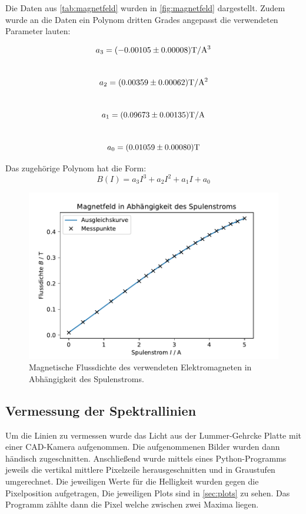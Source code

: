\FloatBarrier
    Die Daten aus \autoref{tab:magnetfeld} wurden in \autoref{fig:magnetfeld} dargestellt. Zudem wurde 
    an die Daten ein Polynom dritten Grades angepasst die verwendeten Parameter lauten:
    \begin{center}
        $$a_3 = (-0.00105 \pm 0.00008)  \si[]{\tesla\per\ampere^3}$$\\
        $$a_2 = (0.00359 \pm 0.00062)  \si[]{\tesla\per\ampere^2}$$\\
        $$a_1 = (0.09673 \pm 0.00135)  \si[]{\tesla/\ampere}$$\\
        $$a_0 = (0.01059 \pm 0.00080)  \si[]{\tesla}$$
    \end{center}
    Das zugehörige Polynom hat die Form:
    \begin{equation*}
      B(I)=a_3I^3+a_2I^2+a_1I+a_0
    \end{equation*}

    \begin{figure}
        \centering
        \includegraphics[width=1\textwidth]{content/grafiken/magnetfeld.pdf}
        \caption{Magnetische Flussdichte des verwendeten Elektromagneten in Abhängigkeit des Spulenstroms.}
        \label{fig:magnetfeld}
      \end{figure}
\subsection{Vermessung der Spektrallinien}
\label{sec:linien}
Um die Linien zu vermessen wurde das Licht aus der Lummer-Gehrcke Platte mit einer CAD-Kamera
aufgenommen. Die aufgenommenen Bilder wurden dann händisch zugeschnitten. 
Anschließend wurde mittels eines Python-Programms jeweils die  vertikal mittlere
Pixelzeile herausgeschnitten und in Graustufen umgerechnet. Die jeweiligen Werte für die Helligkeit wurden 
gegen die Pixelposition aufgetragen, Die jeweiligen Plots sind in \autoref{sec:plots} zu sehen.  Das Programm 
zählte dann die  Pixel welche zwischen zwei Maxima liegen. 
\FloatBarrier
